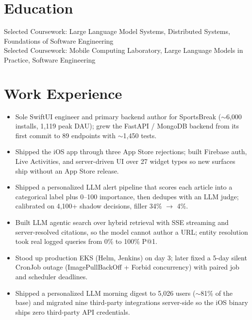 \documentclass[11pt, letterpaper]{article}
\begin{document}

\section{Education}
Selected Coursework: Large Language Model Systems, Distributed Systems, Foundations of Software Engineering\\[1pt]
Selected Coursework: Mobile Computing Laboratory, Large Language Models in Practice, Software Engineering

\section{Work Experience}
\begin{itemize}
  \item Sole SwiftUI engineer and primary backend author for SportsBreak ($\sim$6{,}000 installs, 1{,}119 peak DAU); grew the FastAPI / MongoDB backend from its first commit to 89 endpoints with $\sim$1{,}450 tests.
  \item Shipped the iOS app through three App Store rejections; built Firebase auth, Live Activities, and server-driven UI over 27 widget types so new surfaces ship without an App Store release.
  \item Shipped a personalized LLM alert pipeline that scores each article into a categorical label plus 0--100 importance, then dedupes with an LLM judge; calibrated on 4{,}100+ shadow decisions, filler 34\% $\to$ 4\%.
  \item Built LLM agentic search over hybrid retrieval with SSE streaming and server-resolved citations, so the model cannot author a URL; entity resolution took real logged queries from 0\% to 100\% P@1.
  \item Stood up production EKS (Helm, Jenkins) on day 3; later fixed a 5-day silent CronJob outage (ImagePullBackOff + Forbid concurrency) with paired job and scheduler deadlines.
  \item Shipped a personalized LLM morning digest to 5{,}026 users ($\sim$81\% of the base) and migrated nine third-party integrations server-side so the iOS binary ships zero third-party API credentials.
\end{itemize}
\end{document}
